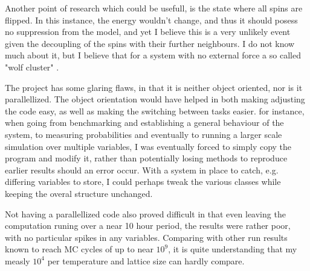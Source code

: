 \documentclass[10pt, twocolumn]{revtex4-1}
\begin{document}
Another point of research which could be usefull, is the state where all spins are flipped. In this instance, the energy wouldn't change, and thus it should
posess no suppression from the model, and yet I believe this is a very unlikely event given the decoupling of the spins with their further neighbours. I do
not know much about it, but I believe that for a system with no external force a so called "wolf cluster" \cite{WolfCluster}.

The project has some glaring flaws, in that it is neither object oriented, nor is it parallellized. The object orientation would have helped in both making
adjusting the code easy, as well as making the switching between tasks easier. for instance, when going from benchmarking and establishing a general
behaviour of the system, to measuring probabilities and eventually to running a larger scale simulation over multiple variables, I was eventually forced
to simply copy the program and modify it, rather than potentially losing methods to reproduce earlier results should an error occur. With a system in place
to catch, e.g. differing variables to store, I could perhaps tweak the various classes while keeping the overal structure unchanged.

Not having a parallellized code also proved difficult in that even leaving the computation runing over a near 10 hour period, the results were rather poor,
with no particular spikes in any variables. Comparing with other run results known to reach MC cycles of up to near $10^9$, it is quite understanding that
my measly $10^4$ per temperature and lattice size can hardly compare.



\end{document}
